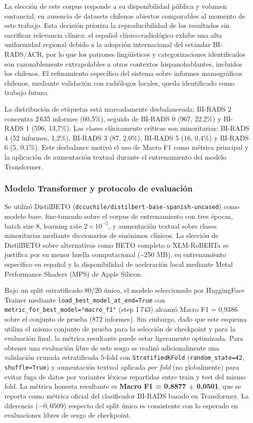 \documentclass[10pt,journal,a4paper]{IEEEtran}
\begin{document}
La elecci\'on de este corpus responde a su disponibilidad p\'ublica y volumen sustancial, en ausencia de datasets chilenos abiertos comparables al momento de este trabajo. Esta decisi\'on prioriza la reproducibilidad de los resultados sin sacrificar relevancia cl\'inica: el espa\~nol cl\'inico-radiol\'ogico exhibe una alta uniformidad regional debido a la adopci\'on internacional del est\'andar BI-RADS/ACR, por lo que los patrones ling\"u\'isticos y categorizaciones identificados son razonablemente extrapolables a otros contextos hispanohablantes, incluidos los chilenos. El refinamiento espec\'ifico del sistema sobre informes mamogr\'aficos chilenos, mediante validaci\'on con radi\'ologos locales, queda identificado como trabajo futuro.

La distribuci\'on de etiquetas est\'a marcadamente desbalanceada: BI-RADS 2 concentra 2\,635 informes (60,5\%), seguido de BI-RADS 0 (967, 22,2\%) y BI-RADS 1 (596, 13,7\%). Las clases cl\'inicamente cr\'iticas son minoritarias: BI-RADS 4 (52 informes, 1,2\%), BI-RADS 3 (87, 2,0\%), BI-RADS 5 (16, 0,4\%) y BI-RADS 6 (5, 0,1\%). Este desbalance motiv\'o el uso de Macro F1 como m\'etrica principal y la aplicaci\'on de aumentaci\'on textual durante el entrenamiento del modelo Transformer.

\subsubsection{Modelo Transformer y protocolo de evaluaci\'on}
Se utiliz\'o DistilBETO (\texttt{dccuchile/distilbert-base-spanish-uncased}) \cite{canete2020} como modelo base, fine-tuneado sobre el corpus de entrenamiento con tres \'epocas, batch size 8, learning rate $2\times10^{-5}$, y aumentaci\'on textual sobre clases minoritarias mediante diccionarios de sin\'onimos cl\'inicos. La elecci\'on de DistilBETO sobre alternativas como BETO completo o XLM-RoBERTa se justifica por su menor huella computacional (\textasciitilde 250 MB), su entrenamiento espec\'ifico en espa\~nol y la disponibilidad de aceleraci\'on local mediante Metal Performance Shaders (MPS) de Apple Silicon.

Bajo un split estratificado 80/20 \'unico, el modelo seleccionado por HuggingFace Trainer mediante \texttt{load\_best\_model\_at\_end=True} con \texttt{metric\_for\_best\_model="macro\_f1"} (step 1\,743) alcanz\'o Macro F1 = 0,9386 sobre el conjunto de prueba (872 informes). Sin embargo, dado que este esquema utiliza el mismo conjunto de prueba para la selecci\'on de checkpoint y para la evaluaci\'on final, la m\'etrica resultante puede estar ligeramente optimizada. Para obtener una evaluaci\'on libre de este sesgo se realiz\'o adicionalmente una validaci\'on cruzada estratificada 5-fold con \texttt{StratifiedKFold} (\texttt{random\_state=42}, \texttt{shuffle=True}) y aumentaci\'on textual aplicada \emph{por fold} (no globalmente) para evitar fuga de datos por variantes l\'exicas repartidas entre train y test del mismo fold. La m\'etrica honesta resultante es \textbf{Macro F1 = 0,8877 $\pm$ 0,0501}, que se reporta como m\'etrica oficial del clasificador BI-RADS basado en Transformer. La diferencia ($-0,0509$) respecto del split \'unico es consistente con lo esperado en evaluaciones libres de sesgo de checkpoint.
\end{document}
